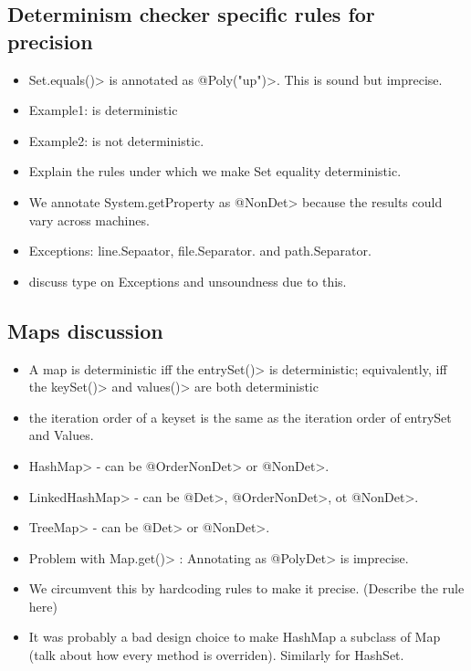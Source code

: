 \subsection{Determinism checker specific rules for precision}\label{precision}

\begin{itemize}
    \item \<Set.equals()> is annotated as \<@Poly("up")>. This is sound but imprecise.
    \item Example1:  is deterministic
    \item Example2:  is not deterministic.
    \item Explain the rules under which we make Set equality deterministic.
    \item We annotate System.getProperty as \<@NonDet> because the results could vary across machines.
    \item Exceptions: line.Sepaator, file.Separator. and path.Separator.
    \item discuss type on Exceptions and unsoundness due to this.
\end{itemize}

\subsection{Maps discussion}\label{maps}

\begin{itemize}
    \item A map is deterministic iff the \<entrySet()> is
          deterministic; equivalently, iff the \<keySet()> and \<values()>
          are both deterministic
    \item the iteration order of a keyset is the same as the iteration order of entrySet and Values.
    \item \<HashMap> - can be \<@OrderNonDet> or \<@NonDet>.
    \item \<LinkedHashMap> - can be \<@Det>, \<@OrderNonDet>, ot \<@NonDet>.
    \item \<TreeMap> - can be \<@Det> or \<@NonDet>.
    \item Problem with \<Map.get()> : Annotating as \<@PolyDet> is imprecise.
    \item We circumvent this by hardcoding rules to make it precise. (Describe the rule here)
    \item It was probably a bad design choice to make HashMap a subclass of Map (talk about how
    every method is overriden). Similarly for HashSet.
\end{itemize}

